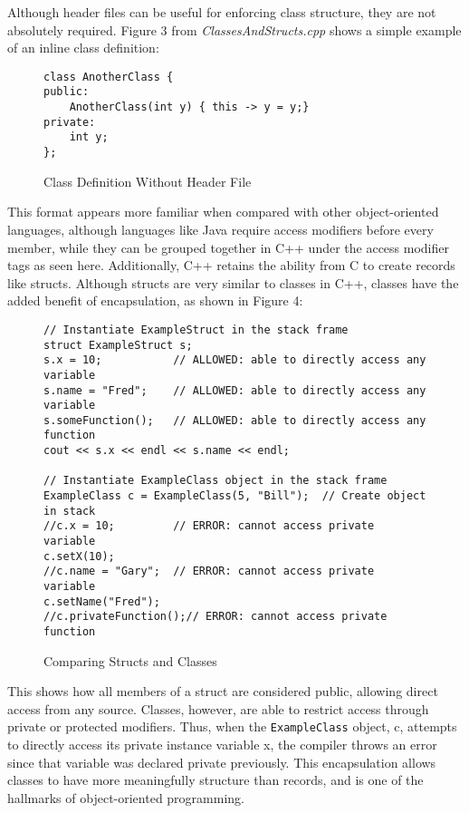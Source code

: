 \documentclass[11pt]{article}
\begin{document}
	Although header files can be useful for enforcing class structure, they are not absolutely required.  Figure 3 from \textit{ClassesAndStructs.cpp} shows a simple example of an inline class definition:

\begin{figure}[!h]
\centering
\begin{BVerbatim}
class AnotherClass {
public:
	AnotherClass(int y) { this -> y = y;}
private:
	int y;
};
\end{BVerbatim}
\caption{Class Definition Without Header File}
\end{figure} \FloatBarrier

\noindent
This format appears more familiar when compared with other object-oriented languages, although languages like Java require access modifiers before every member, while they can be grouped together in C++ under the access modifier tags as seen here.  Additionally, C++ retains the ability from C to create records like structs.  Although structs are very similar to classes in C++, classes have the added benefit of encapsulation, as shown in Figure 4:

\begin{figure}[!h]
\centering
\begin{BVerbatim}
// Instantiate ExampleStruct in the stack frame
struct ExampleStruct s;
s.x = 10;           // ALLOWED: able to directly access any variable
s.name = "Fred";    // ALLOWED: able to directly access any variable
s.someFunction();   // ALLOWED: able to directly access any function
cout << s.x << endl << s.name << endl;

// Instantiate ExampleClass object in the stack frame
ExampleClass c = ExampleClass(5, "Bill");  // Create object in stack
//c.x = 10;         // ERROR: cannot access private variable
c.setX(10);
//c.name = "Gary";  // ERROR: cannot access private variable
c.setName("Fred");
//c.privateFunction();// ERROR: cannot access private function
\end{BVerbatim}
\caption{Comparing Structs and Classes}
\end{figure} \FloatBarrier

\noindent
This shows how all members of a struct are considered public, allowing direct access from any source.  Classes, however, are able to restrict access through private or protected modifiers.  Thus, when the \texttt{ExampleClass} object, c, attempts to directly access its private instance variable x, the compiler throws an error since that variable was declared private previously.  This encapsulation allows classes to have more meaningfully structure than records, and is one of the hallmarks of object-oriented programming.
\end{document}
